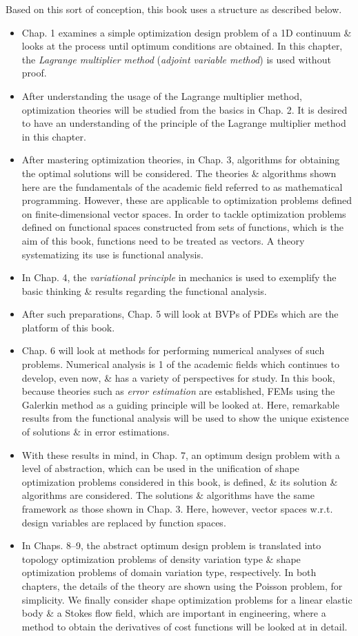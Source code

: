 \documentclass[oneside]{book}
\numberwithin{equation}{section}
\begin{document}
Based on this sort of conception, this book uses a structure as described below.
\begin{itemize}
	\item Chap. 1 examines a simple optimization design problem of a 1D continuum \& looks at the process until optimum conditions are obtained. In this chapter, the \textit{Lagrange multiplier method} (\textit{adjoint variable method}) is used without proof.
	\item After understanding the usage of the Lagrange multiplier method, optimization theories will be studied from the basics in Chap. 2. It is desired to have an understanding of the principle of the Lagrange multiplier method in this chapter.
	\item After mastering optimization theories, in Chap. 3, algorithms for obtaining the optimal solutions will be considered. The theories \& algorithms shown here are the fundamentals of the academic field referred to as mathematical programming. However, these are applicable to optimization problems defined on finite-dimensional vector spaces. In order to tackle optimization problems defined on functional spaces constructed from sets of functions, which is the aim of this book, functions need to be treated as vectors. A theory systematizing its use is functional analysis.
	\item In Chap. 4, the \textit{variational principle} in mechanics is used to exemplify the basic thinking \& results regarding the functional analysis.
	\item After such preparations, Chap. 5 will look at BVPs of PDEs which are the platform of this book.
	\item Chap. 6 will look at methods for performing numerical analyses of such problems. Numerical analysis is 1 of the academic fields which continues to develop, even now, \& has a variety of perspectives for study. In this book, because theories such as \textit{error estimation} are established, FEMs using the Galerkin method as a guiding principle will be looked at. Here, remarkable results from the functional analysis will be used to show the unique existence of solutions \& in error estimations.
	\item With these results in mind, in Chap. 7, an optimum design problem with a level of abstraction, which can be used in the unification of shape optimization problems considered in this book, is defined, \& its solution \& algorithms are considered. The solutions \& algorithms have the same framework as those shown in Chap. 3. Here, however, vector spaces w.r.t. design variables are replaced by function spaces.
	\item In Chaps. 8--9, the abstract optimum design problem is translated into topology optimization problems of density variation type \& shape optimization problems of domain variation type, respectively. In both chapters, the details of the theory are shown using the Poisson problem, for simplicity. We finally consider shape optimization problems for a linear elastic body \& a Stokes flow field, which are important in engineering, where a method to obtain the derivatives of cost functions will be looked at in detail.
\end{itemize}
\end{document}
